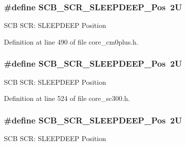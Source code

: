 \subsubsection[{\texorpdfstring{S\+C\+B\+\_\+\+S\+C\+R\+\_\+\+S\+L\+E\+E\+P\+D\+E\+E\+P\+\_\+\+Pos}{SCB_SCR_SLEEPDEEP_Pos}}]{\setlength{\rightskip}{0pt plus 5cm}\#define S\+C\+B\+\_\+\+S\+C\+R\+\_\+\+S\+L\+E\+E\+P\+D\+E\+E\+P\+\_\+\+Pos~2U}\hypertarget{group___c_m_s_i_s___s_c_b_gab304f6258ec03bd9a6e7a360515c3cfe}{}\label{group___c_m_s_i_s___s_c_b_gab304f6258ec03bd9a6e7a360515c3cfe}
S\+CB S\+CR\+: S\+L\+E\+E\+P\+D\+E\+EP Position 

Definition at line 490 of file core\+\_\+cm0plus.\+h.

\subsubsection[{\texorpdfstring{S\+C\+B\+\_\+\+S\+C\+R\+\_\+\+S\+L\+E\+E\+P\+D\+E\+E\+P\+\_\+\+Pos}{SCB_SCR_SLEEPDEEP_Pos}}]{\setlength{\rightskip}{0pt plus 5cm}\#define S\+C\+B\+\_\+\+S\+C\+R\+\_\+\+S\+L\+E\+E\+P\+D\+E\+E\+P\+\_\+\+Pos~2U}\hypertarget{group___c_m_s_i_s___s_c_b_gab304f6258ec03bd9a6e7a360515c3cfe}{}\label{group___c_m_s_i_s___s_c_b_gab304f6258ec03bd9a6e7a360515c3cfe}
S\+CB S\+CR\+: S\+L\+E\+E\+P\+D\+E\+EP Position 

Definition at line 524 of file core\+\_\+sc300.\+h.

\subsubsection[{\texorpdfstring{S\+C\+B\+\_\+\+S\+C\+R\+\_\+\+S\+L\+E\+E\+P\+D\+E\+E\+P\+\_\+\+Pos}{SCB_SCR_SLEEPDEEP_Pos}}]{\setlength{\rightskip}{0pt plus 5cm}\#define S\+C\+B\+\_\+\+S\+C\+R\+\_\+\+S\+L\+E\+E\+P\+D\+E\+E\+P\+\_\+\+Pos~2U}\hypertarget{group___c_m_s_i_s___s_c_b_gab304f6258ec03bd9a6e7a360515c3cfe}{}\label{group___c_m_s_i_s___s_c_b_gab304f6258ec03bd9a6e7a360515c3cfe}
S\+CB S\+CR\+: S\+L\+E\+E\+P\+D\+E\+EP Position 

